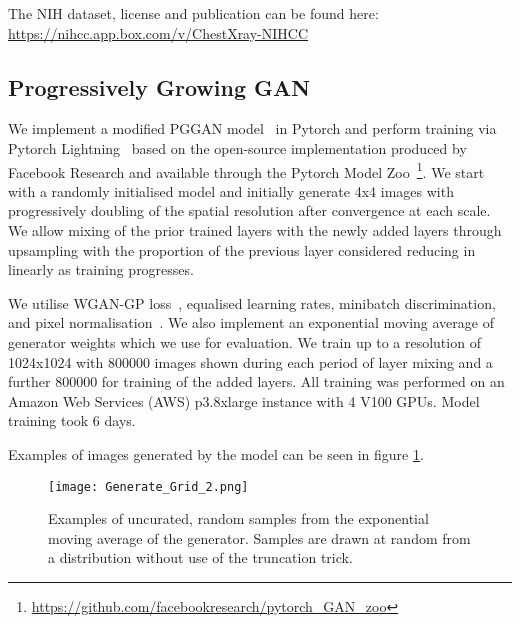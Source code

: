 \documentclass{article}
\begin{document}
The NIH dataset, license and publication can be found here: \url{https://nihcc.app.box.com/v/ChestXray-NIHCC}

\subsection{Progressively Growing GAN}
\label{sec:gan-train}
We implement a modified PGGAN model~\cite{karrasProgressiveGrowingGANs2018} in Pytorch and perform training via Pytorch Lightning~\cite{falconPyTorchLightning2019} based on the open-source implementation produced by Facebook Research and available through the Pytorch Model Zoo~\footnote{\url{https://github.com/facebookresearch/pytorch_GAN_zoo}}. We start with a randomly initialised model and initially generate 4x4 images with progressively doubling of the spatial resolution after convergence at each scale. We allow mixing of the prior trained layers with the newly added layers through upsampling with the proportion of the previous layer considered reducing in linearly as training progresses.

We utilise WGAN-GP loss~\cite{gulrajaniImprovedTrainingWasserstein2017}, equalised learning rates, minibatch discrimination, and pixel normalisation~\cite{karrasProgressiveGrowingGANs2018}. We also implement an exponential moving average of generator weights which we use for evaluation. We train up to a resolution of 1024x1024 with \num{800000} images shown during each period of layer mixing and a further \num{800000} for training of the added layers. All training was performed on an Amazon Web Services (AWS) p3.8xlarge instance with 4 V100 GPUs. Model training took 6 days.

Examples of images generated by the model can be seen in figure \ref{fig:collage}.

\begin{figure}
    \centering
    \texttt{[image: Generate\_Grid\_2.png]}
    \caption{Examples of uncurated, random samples from the exponential moving average of the generator. Samples are drawn at random from a  distribution without use of the truncation trick.}
    \label{fig:collage}
\end{figure}
\end{document}

